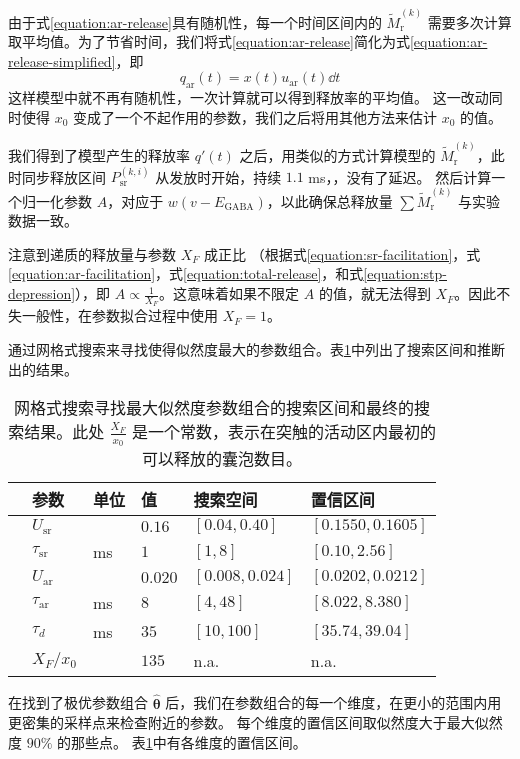 由于式\ref{equation:ar-release}具有随机性，每一个时间区间内的 $\tilde{M}_\text{r}^{(k)}$ 需要多次计算取平均值。为了节省时间，我们将式\ref{equation:ar-release}简化为式\ref{equation:ar-release-simplified}，即
\begin{equation*}
q_\text{ar}(t) = x(t) u_\text{ar}(t)\dd{t}
\end{equation*}
这样模型中就不再有随机性，一次计算就可以得到释放率的平均值。
这一改动同时使得 $x_0$ 变成了一个不起作用的参数，我们之后将用其他方法来估计 $x_0$ 的值。

我们得到了模型产生的释放率 $q'(t)$ 之后，用类似的方式计算模型的 $\tilde{M}_\text{r}^{(k)}$，此时同步释放区间 $P_\text{sr}^{(k,i)}$ 从发放时开始，持续 $1.1$ ms，，没有了延迟。
然后计算一个归一化参数 $A$，对应于 $w(v-E_\text{GABA})$，以此确保总释放量 $\sum \tilde{M}_\text{r}^{(k)}$ 与实验数据一致。

注意到递质的释放量与参数 $X_F$ 成正比 （根据式\ref{equation:sr-facilitation}，式\ref{equation:ar-facilitation}，式\ref{equation:total-release}，和式\ref{equation:stp-depression}），即 $A \propto \frac{1}{X_F}$。这意味着如果不限定 $A$ 的值，就无法得到 $X_F$。因此不失一般性，在参数拟合过程中使用 $X_F = 1$。

通过网格式搜索来寻找使得似然度最大的参数组合。表\ref{table:parameters}中列出了搜索区间和推断出的结果。
\begin{table}
  \centering
  \begin{tabular}{llllll}
    \hline\hline
    & 参数 & 单位 & 值 & 搜索空间 & 置信区间 \\
    \hline
    & $U_\text{sr}$ & & $0.16$ & $[0.04, 0.40]$ & $[0.1550, 0.1605]$ \\
    & $\tau_\text{sr}$& ms & $1$ & $[1, 8]$ & $[0.10, 2.56]$ \\
    & $U_\text{ar}$ & & $0.020$ & $[0.008, 0.024]$ & $[0.0202, 0.0212]$ \\
    & $\tau_\text{ar}$ &ms & $8$ & $[4, 48]$ & $[8.022, 8.380]$ \\
    & $\tau_d$ &ms & $35$ & $[10, 100]$ & $[35.74, 39.04]$ \\
    & $X_F / x_0$& & $135$ & n.a. & n.a. \\
    \hline
\end{tabular}
\caption{网格式搜索寻找最大似然度参数组合的搜索区间和最终的搜索结果。此处 $\frac{X_F}{x_0}$ 是一个常数，表示在突触的活动区内最初的可以释放的囊泡数目。}
\label{table:parameters}
\end{table}

在找到了极优参数组合 $\bm{\hat{\theta}}$ 后，我们在参数组合的每一个维度，在更小的范围内用更密集的采样点来检查附近的参数。
每个维度的置信区间取似然度大于最大似然度 $90\%$ 的那些点。
表\ref{table:parameters}中有各维度的置信区间。

